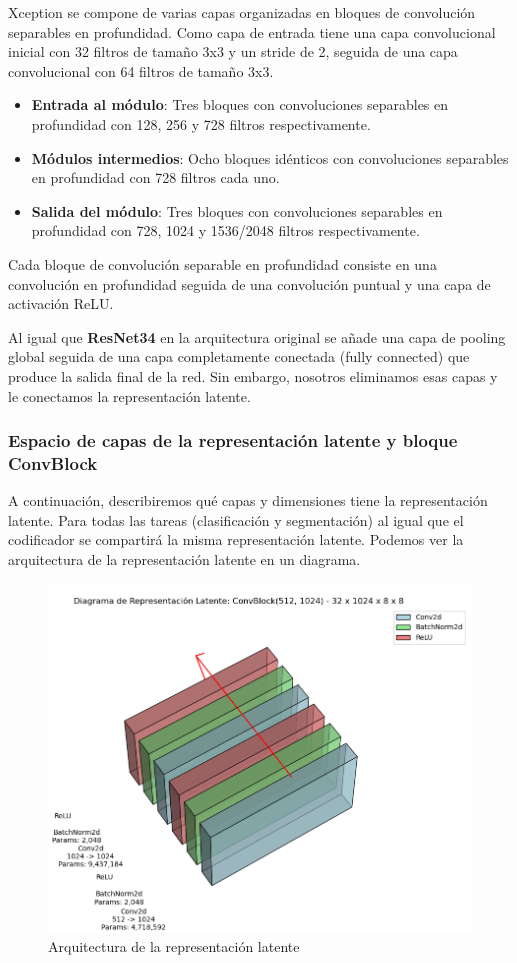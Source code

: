 Xception se compone de varias capas organizadas en bloques de convolución separables en profundidad. Como capa de entrada tiene una capa convolucional inicial con 32 filtros de tamaño 3x3 y un stride de 2, seguida de una capa convolucional con 64 filtros de tamaño 3x3.

\begin{itemize}
	\item \textbf{Entrada al módulo}: Tres bloques con convoluciones separables en profundidad con 128, 256 y 728 filtros respectivamente.
	\item \textbf{Módulos intermedios}: Ocho bloques idénticos con convoluciones separables en profundidad con 728 filtros cada uno.
	\item \textbf{Salida del módulo}: Tres bloques con convoluciones separables en profundidad con 728, 1024 y 1536/2048 filtros respectivamente.
\end{itemize}

Cada bloque de convolución separable en profundidad consiste en una convolución en profundidad seguida de una convolución puntual y una capa de activación ReLU.

Al igual que \textbf{ResNet34} en la arquitectura original se añade una capa de pooling global seguida de una capa completamente conectada (fully connected) que produce la salida final de la red. Sin embargo, nosotros eliminamos esas capas y le conectamos la representación latente.

\subsubsection{Espacio de capas de la representación latente y bloque ConvBlock}

A continuación, describiremos qué capas y dimensiones tiene la representación latente. Para todas las tareas (clasificación y segmentación) al igual que el codificador se compartirá la misma representación latente. Podemos ver la arquitectura de la representación latente en un diagrama.

\begin{figure}[H]
	\centering
	\includegraphics[width=0.8\linewidth]{imagenes/bottleneck_arch.png}
	\caption{Arquitectura de la representación latente}
\end{figure}

